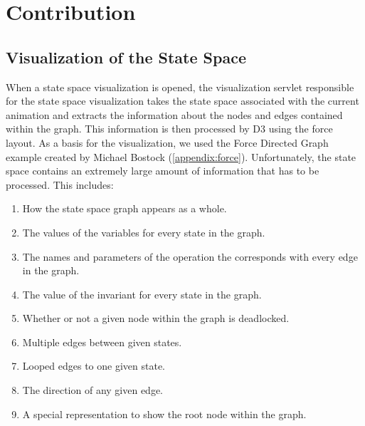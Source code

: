 \section{Contribution}

\subsection{Visualization of the State Space}

When a state space visualization is opened, the visualization servlet responsible for the state space visualization takes the state space associated with the current animation and extracts the information about the nodes and edges contained within the graph. This information is then processed by D3 using the force layout. As a basis for the visualization, we used the Force Directed Graph example created by Michael Bostock (\ref{appendix:force}). Unfortunately, the state space contains an extremely large amount of information that has to be processed. This includes:

\begin{enumerate}
\item{How the state space graph appears as a whole.}
\item{The values of the variables for every state in the graph.}
\item{The names and parameters of the operation the corresponds with every edge in the graph.}
\item{The value of the invariant for every state in the graph.}
\item{Whether or not a given node within the graph is deadlocked.}
\item{Multiple edges between given states.}
\item{Looped edges to one given state.}
\item{The direction of any given edge.}
\item{A special representation to show the root node within the graph.}
\end{enumerate}

